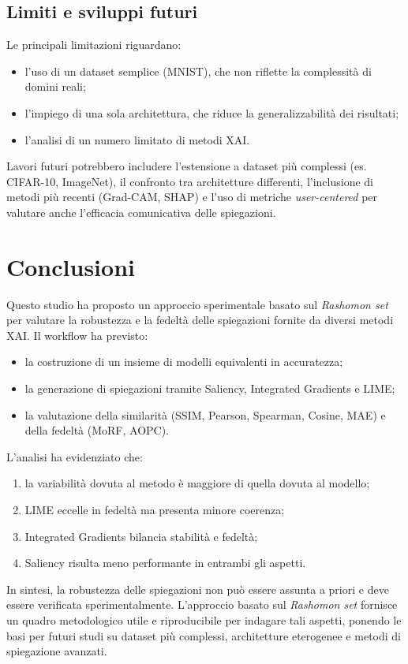 \documentclass{article}
\begin{document}
\subsection{Limiti e sviluppi futuri}
Le principali limitazioni riguardano:
\begin{itemize}
      \item l’uso di un dataset semplice (MNIST), che non riflette la complessità di domini
            reali;
      \item l’impiego di una sola architettura, che riduce la generalizzabilità dei
            risultati;
      \item l’analisi di un numero limitato di metodi XAI.
\end{itemize}

Lavori futuri potrebbero includere l’estensione a dataset più complessi (es.
CIFAR-10, ImageNet), il confronto tra architetture differenti, l’inclusione di
metodi più recenti (Grad-CAM, SHAP) e l’uso di metriche \emph{user-centered}
per valutare anche l’efficacia comunicativa delle spiegazioni.

\section*{Conclusioni}

Questo studio ha proposto un approccio sperimentale basato sul \emph{Rashomon
      set} per valutare la robustezza e la fedeltà delle spiegazioni fornite da
diversi metodi XAI. Il workflow ha previsto:
\begin{itemize}
      \item la costruzione di un insieme di modelli equivalenti in accuratezza;
      \item la generazione di spiegazioni tramite Saliency, Integrated Gradients e LIME;
      \item la valutazione della similarità (SSIM, Pearson, Spearman, Cosine, MAE) e della
            fedeltà (MoRF, AOPC).
\end{itemize}

L’analisi ha evidenziato che:
\begin{enumerate}
      \item la variabilità dovuta al metodo è maggiore di quella dovuta al modello;
      \item LIME eccelle in fedeltà ma presenta minore coerenza;
      \item Integrated Gradients bilancia stabilità e fedeltà;
      \item Saliency risulta meno performante in entrambi gli aspetti.
\end{enumerate}

In sintesi, la robustezza delle spiegazioni non può essere assunta a priori e
deve essere verificata sperimentalmente. L’approccio basato sul \emph{Rashomon
      set} fornisce un quadro metodologico utile e riproducibile per indagare tali
aspetti, ponendo le basi per futuri studi su dataset più complessi,
architetture eterogenee e metodi di spiegazione avanzati.



\end{document}
